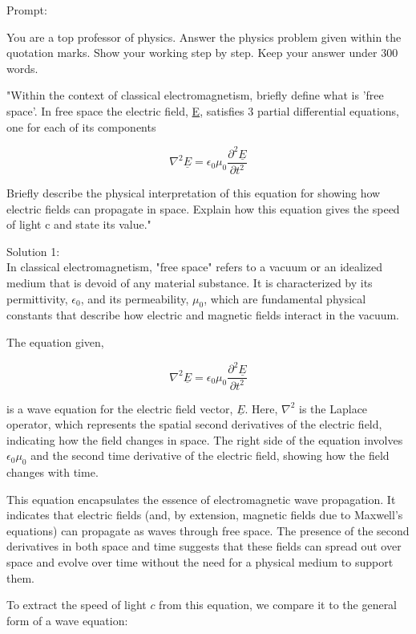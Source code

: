 \documentclass[a4paper,11pt]{article}
\begin{document}
Prompt:
\begin{spverbatim}
    You are a top professor of physics. Answer the physics problem given within the quotation marks. Show your working step by step. Keep your answer under 300 words.

    "Within the context of classical electromagnetism, briefly define what is 'free space'. In free space the electric field, \underline{E}, satisfies 3 partial differential equations, one for each of its components

    \[
    \nabla^{2}\underline{E} =  \epsilon_{0}\mu_{0}\frac{\partial^2 \underline{E}}{\partial t^{2}}
    \]

    Briefly describe the physical interpretation of this equation for showing how electric fields can propagate in space. Explain how this equation gives the speed of light c and state its value." 
\end{spverbatim}

\bigskip

\noindent Solution 1: \\

In classical electromagnetism, "free space" refers to a vacuum or an idealized medium that is devoid of any material substance. It is characterized by its permittivity, $\epsilon_{0}$, and its permeability, $\mu_{0}$, which are fundamental physical constants that describe how electric and magnetic fields interact in the vacuum.

The equation given,

\[
\nabla^{2}\underline{E} =  \epsilon_{0}\mu_{0}\frac{\partial^2 \underline{E}}{\partial t^{2}}
\]

is a wave equation for the electric field vector, $\underline{E}$. Here, $\nabla^{2}$ is the Laplace operator, which represents the spatial second derivatives of the electric field, indicating how the field changes in space. The right side of the equation involves $\epsilon_{0}\mu_{0}$ and the second time derivative of the electric field, showing how the field changes with time.

This equation encapsulates the essence of electromagnetic wave propagation. It indicates that electric fields (and, by extension, magnetic fields due to Maxwell's equations) can propagate as waves through free space. The presence of the second derivatives in both space and time suggests that these fields can spread out over space and evolve over time without the need for a physical medium to support them.

To extract the speed of light $c$ from this equation, we compare it to the general form of a wave equation:
\end{document}
